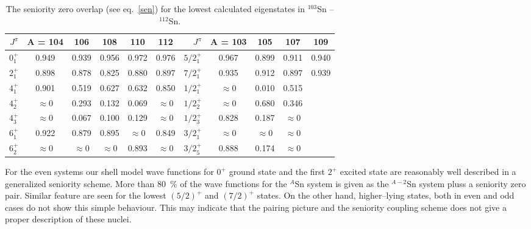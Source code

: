 %
\begin{table}[htbp]
%
\begin{center}
\begin{tabular}{|r|ccccc||r|cccc|} \hline
 $J^{\pi}$ & A = 104 &  106 & 108 & 110 & 112 &
$J^{\pi}$ & A = 103 & 105 & 107 & 109\\
\hline
$0^{+}_{1}$ & 0.949       & 0.939       & 0.956       & 0.972       & 0.976&
$5/2^{+}_{1}$ & 0.967       & 0.899       & 0.911       & 0.940             \\
$2^{+}_{1}$   & 0.898       & 0.878       & 0.825       & 0.880       & 0.897&
$7/2^{+}_{1}$ & 0.935       & 0.912       & 0.897       & 0.939            \\
$4^{+}_{1}$   & 0.901       & 0.519       & 0.627       & 0.632       & 0.850&
$1/2^{+}_{1}$ & $\approx 0$ & 0.010       & 0.515       &             \\
$4^{+}_{2}$   & $\approx 0$ & 0.293       & 0.132    & 0.069 &$\approx 0 $ &
$1/2^{+}_{2}$ & $\approx 0$ & 0.680       & 0.346       &             \\
{$4^{+}_{3}$} & $\approx 0$ & 0.067       & 0.100       & 0.129 &$\approx 0 $
&$1/2^{+}_{3}$ & 0.828       & 0.187       & $\approx 0$ &             \\
$6^{+}_{1}$   & 0.922       & 0.879       & 0.895    & $\approx 0$ & 0.849& 
$3/2^{+}_{1}$ & $\approx 0$ & $\approx 0$ &$\approx 0$  &             \\
$6^{+}_{2}$ & $\approx 0$   & $\approx 0$ &$\approx 0$  & 0.893       
&$\approx 0 $     &
$3/2^{+}_{5}$ & 0.888       & 0.174       & $\approx 0$ &             \\ 
\hline
\end{tabular}
\end{center}






\caption{\label{tab-sen}The seniority zero overlap (see eq.~\ref{sen})
for the lowest calculated eigenstates in $^{103}$Sn -- $^{112}$Sn.}
\end{table}

For the even systems our shell model wave functions for 
$0^{+}$ ground state and the first $2^{+}$ excited state
 are reasonably well described in a generalized seniority scheme.
More than 80~\% of the wave functions for the $^{A}$Sn system
is given as the $^{A-2}$Sn system pluss a seniority zero pair. Similar feature
are seen for the lowest $(5/2)^{+}$ and $(7/2)^{+}$ states.
On the other hand, higher--lying states, both in even and odd cases
do not show  this simple behaviour. This may  indicate
that the pairing picture and the seniority coupling scheme 
does not give a proper description of these nuclei.

